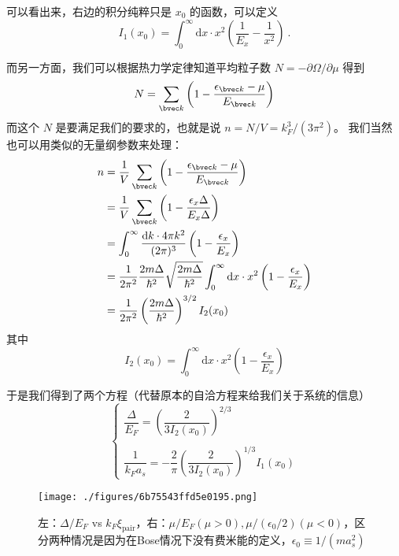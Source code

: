 可以看出来，右边的积分纯粹只是 $x_0$ 的函数，可以定义
\begin{equation}
I_1(x_0) = \int_0^\infty \text{d}x\cdot x^2\left(\frac{1}{E_x}-\frac{1}{x^2}\right)~.
\end{equation}

而另一方面，我们可以根据热力学定律知道平均粒子数 $N=-\partial\Omega/\partial\mu$ 得到
\begin{equation}
N = \sum_{\bvec k}\left(1-\frac{\epsilon_{\bvec k}-\mu}{E_{\bvec k}}\right)
\end{equation}
而这个 $N$ 是要满足我们的要求的，也就是说 $n=N/V=k_F^3/(3\pi^2)$。 我们当然也可以用类似的无量纲参数来处理：
\begin{equation}
\begin{split}
n &= \frac{1}{V}\sum_{\bvec k}\left(1-\frac{\epsilon_{\bvec k}-\mu}{E_{\bvec k}}\right)\\
&=\frac{1}{V}\sum_{\bvec k}\left(1-\frac{\epsilon_x{\Delta}}{E_x{\Delta}}\right)\\ %
&=\int_0^\infty\frac{\text{d}k \cdot 4\pi k^2}{(2\pi)^3}\left(1-\frac{\epsilon_x}{E_x}\right)\\
&=\frac{1}{2\pi^2}\frac{2m\Delta}{\hbar^2}\sqrt{\frac{2m\Delta}{\hbar^2}}\int_0^\infty\text{d}x\cdot x^2\left(1-\frac{\epsilon_x}{E_x}\right)\\
&=\frac{1}{2\pi^2}\left(\frac{2m\Delta}{\hbar^2}\right)^{3/2}I_2(x_0)
\end{split}
\end{equation}
其中
\begin{equation}
I_2(x_0)=\int_0^\infty \text{d}x\cdot x^2\left(1-\frac{\epsilon_x}{E_x}\right)
\end{equation}

于是我们得到了两个方程（代替原本的自洽方程来给我们关于系统的信息）
\begin{equation}
\begin{cases}
\dfrac{\Delta}{E_F} = \left(\dfrac{2}{3I_2(x_0)}\right)^{2/3}\\
\ \\
\dfrac{1}{k_Fa_s} = -\dfrac{2}{\pi}\left(\dfrac{2}{3I_2(x_0)}\right)^{1/3}I_1(x_0)
\end{cases}
\end{equation}

\begin{figure}[ht]
\centering
\texttt{[image: ./figures/6b75543ffd5e0195.png]}
\caption{左：$\Delta/E_F$ vs $k_F\xi_{\text{pair}}$，右：$\mu/E_F(\mu>0), \mu/(\epsilon_0/2)(\mu<0)$，区分两种情况是因为在Bose情况下没有费米能的定义，$\epsilon_0\equiv1/(ma_s^2)$} \label{fig_BCSBEC_1}
\end{figure}

